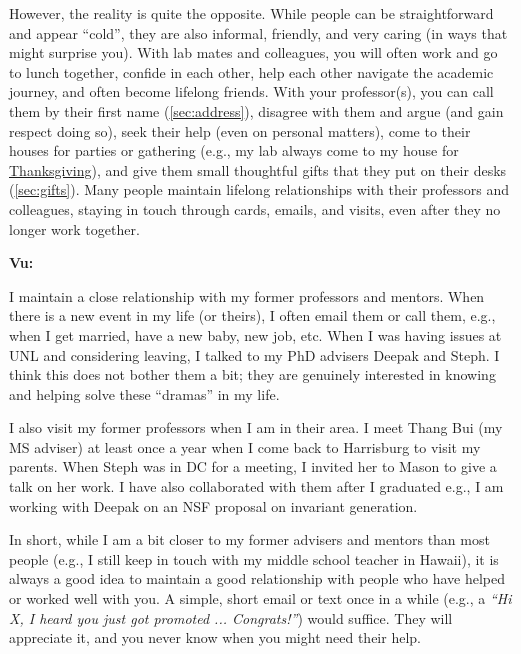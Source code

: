 \documentclass[oneside,11pt,dvipsnames]{book}
\newenvironment{commentbox}[1][]{
  \small
  \begin{mybox}
    {\small \textbf{#1}}
  }{
  \end{mybox}
}
\begin{document}
However, the reality is quite the opposite. While people can be straightforward and appear ``cold'', they are also informal, friendly, and very caring (in ways that might surprise you).
With lab mates and colleagues, you will often work and go to lunch together, confide in each other, help each other navigate the academic journey, and often become lifelong friends.
With your professor(s), you can call them by their first name (\autoref{sec:address}), disagree with them and argue (and gain respect doing so), seek their help (even on personal matters), come to their houses for parties or gathering (e.g., my lab always come to my house for \href{https://photos.app.goo.gl/LFtbqQUuznq9eiL7A}{Thanksgiving}), and give them small thoughtful gifts that they put on their desks (\autoref{sec:gifts}).  
Many people maintain lifelong relationships with their professors and colleagues, staying in touch through cards, emails, and visits, even after they no longer work together.

\begin{commentbox}[Vu:]
    I maintain a close relationship with my former professors and mentors. When there is a new event in my life (or theirs), I often email them or call them, e.g., when I get married, have a new baby, new job, etc. When I was having issues at UNL and considering leaving, I talked to my PhD advisers Deepak and Steph. I think this does not bother them a bit; they are genuinely interested in knowing and helping solve these ``dramas'' in my life.
        
    I also visit my former professors when I am in their area. I meet Thang Bui (my MS adviser) at least once a year when I come back to Harrisburg to visit my parents. When Steph was in DC for a meeting, I invited her to Mason to give a talk on her work. I have also collaborated with them after I graduated e.g., I am working with Deepak on an NSF proposal on invariant generation. 
    
    In short, while I am a bit closer to my former advisers and mentors than most people (e.g., I still keep in touch with my middle school teacher in Hawaii), it is always a good idea to maintain a good relationship with people who have helped or worked well with you. A simple, short email or text once in a while (e.g., a \emph{``Hi X, I heard you just got promoted ... Congrats!''}) would suffice. They will appreciate it, and you never know when you might need their help.
    
    
    
  \end{commentbox}
  
\end{document}
